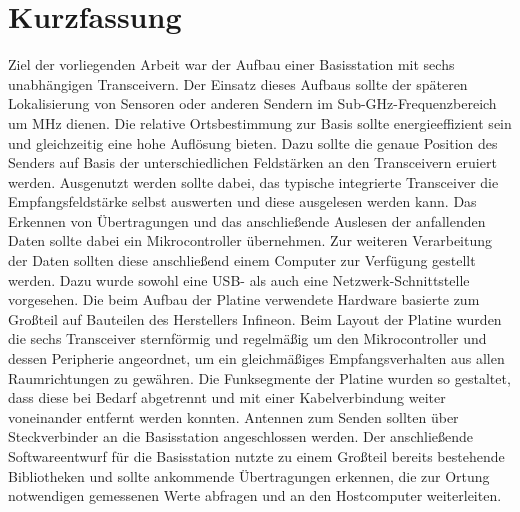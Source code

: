 
\chapter*{Kurzfassung}
\label{sec:kurzfassung}
\pagestyle{scrheadings}

Ziel der vorliegenden Arbeit war der Aufbau einer Basisstation mit sechs unabhängigen Transceivern. Der Einsatz dieses Aufbaus sollte der späteren Lokalisierung von Sensoren oder anderen Sendern im Sub-GHz-Frequenzbereich um \unit[868]{MHz} dienen. Die relative Ortsbestimmung zur Basis sollte energieeffizient sein und gleichzeitig eine hohe Auflösung bieten. 
Dazu sollte die genaue Position des Senders auf Basis der unterschiedlichen Feldstärken an den Transceivern eruiert werden. Ausgenutzt werden sollte dabei, das typische integrierte Transceiver die Empfangsfeldstärke selbst auswerten und diese ausgelesen werden kann. Das Erkennen von Übertragungen und das anschließende Auslesen der anfallenden Daten sollte dabei ein Mikrocontroller übernehmen. Zur weiteren Verarbeitung der Daten sollten diese anschließend einem Computer zur Verfügung gestellt werden. Dazu wurde sowohl eine USB- als auch eine Netzwerk-Schnittstelle vorgesehen. Die beim Aufbau der Platine verwendete Hardware basierte zum Großteil auf Bauteilen des Herstellers Infineon. 
Beim Layout der Platine wurden die sechs Transceiver sternförmig und regelmäßig um den Mikrocontroller und dessen Peripherie angeordnet, um ein gleichmäßiges Empfangsverhalten aus allen Raumrichtungen zu gewähren. Die Funksegmente der Platine wurden so gestaltet, dass diese bei Bedarf abgetrennt und mit einer Kabelverbindung weiter voneinander entfernt werden konnten. Antennen zum Senden sollten über Steckverbinder an die Basisstation angeschlossen werden.
Der anschließende Softwareentwurf für die Basisstation nutzte zu einem Großteil bereits bestehende Bibliotheken und sollte ankommende Übertragungen erkennen, die zur Ortung notwendigen gemessenen Werte abfragen und an den Hostcomputer weiterleiten. 

